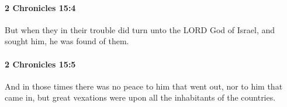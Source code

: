 		\paragraph{2 Chronicles 15:4} %
			\label{2CHRONICLES-15-4}

			But when they in their trouble did turn unto the LORD God of Israel, and sought him, he was found of them.


		\paragraph{2 Chronicles 15:5} %
			\label{2CHRONICLES-15-5}

			And in those times there was no peace to him that went out, nor to him that came in, but great vexations were upon all the inhabitants of the countries.


